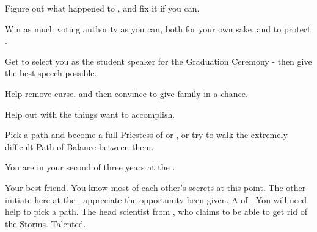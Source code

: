 \documentclass[char]{GL2020}
\begin{document}
\begin{itemz}[Goals]
	\item Figure out what happened to \cLoud{}, and fix it if you can.
	\item Win as much voting authority as you can, both for your own sake, and to protect \pShip{}.
	\item Get \cBeetle{} to select you as the student speaker for the Graduation Ceremony - then give the best speech possible.
	\item Help \cInitiate{} remove \cInitiate{\their} curse, and then convince \cInitiate{\them} to give \cInitiate{\their} family in \pFarm{} a chance.
	\item Help \cHeir{} out with the things \cHeir{\they} want to accomplish.
	\item Pick a path and become a full Priestess of \cEbb{} or \cFlow{}, or try to walk the extremely difficult Path of Balance between them.
\end{itemz}

\begin{itemz}[Notes]
	\item You are in your second of three years at the \pSchool{}.
\end{itemz}

\begin{contacts}
	\contact{\cHeir{}} Your best friend. You know most of each other’s secrets at this point.
	\contact{\cInitiate{}} The other \pShippies{} initiate here at the \pSc{}. \cInitiate{\They}  appreciate the opportunity \cInitiate{\they}  \cInitiate{\have} been given.
	\contact{\cFlowPriest{}} A \cFlowPriest{\cleric} of \cFlow{}. You will need \cFlowPriest{\their} help to pick a path.
\contact{\cHeadScientist{}} The head scientist from \pTech{}, who claims to be able to get rid of the Storms. Talented.
\end{contacts}
\end{document}
